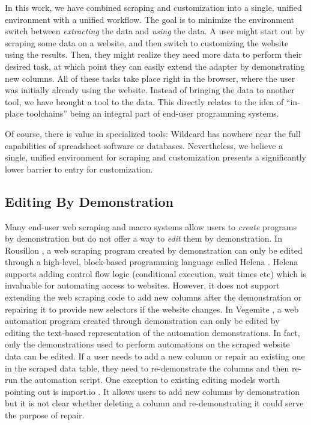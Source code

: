 \documentclass[sigconf,10pt]{acmart}
\begin{document}
In this work, we have combined scraping and customization into a single,
unified environment with a unified workflow. The goal is to minimize the
environment switch between \emph{extracting} the data and \emph{using}
the data. A user might start out by scraping some data on a website, and
then switch to customizing the website using the results. Then, they
might realize they need more data to perform their desired task, at
which point they can easily extend the adapter by demonstrating new
columns. All of these tasks take place right in the browser, where the
user was initially already using the website. Instead of bringing the
data to another tool, we have brought a tool to the data. This directly
relates to the idea of ``in-place toolchains'' \citep{zotero-1362} being
an integral part of end-user programming systems.

Of course, there is value in specialized tools: Wildcard has nowhere
near the full capabilities of spreadsheet software or databases.
Nevertheless, we believe a single, unified environment for scraping and
customization presents a significantly lower barrier to entry for
customization.

\hypertarget{editing-by-demonstration-1}{%
\subsection{Editing By Demonstration}\label{editing-by-demonstration-1}}

Many end-user web scraping and macro systems allow users to
\emph{create} programs by demonstration but do not offer a way to
\emph{edit} them by demonstration. In Rousillon \citep{chasins2018}, a
web scraping program created by demonstration can only be edited through
a high-level, block-based programming language called Helena
\citep{zotero-1349}. Helena supports adding control flow logic
(conditional execution, wait times etc) which is invaluable for
automating access to websites. However, it does not support extending
the web scraping code to add new columns after the demonstration or
repairing it to provide new selectors if the website changes. In
Vegemite \citep{lin2009}, a web automation program created through
demonstration can only be edited by editing the text-based
representation of the automation demonstrations. In fact, only the
demonstrations used to perform automations on the scraped website data
can be edited. If a user needs to add a new column or repair an existing
one in the scraped data table, they need to re-demonstrate the columns
and then re-run the automation script. One exception to existing editing
models worth pointing out is import.io \citep{import.io}. It allows
users to add new columns by demonstration but it is not clear whether
deleting a column and re-demonstrating it could serve the purpose of
repair.
\end{document}
